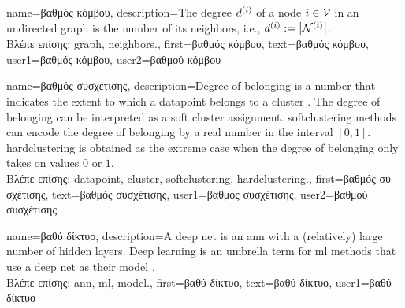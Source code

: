 {name={\foreignlanguage{greek}{βαθμός κόμβου}},
	description={The degree $d^{(i)}$ of a node $i \in \mathcal{V}$ 
		in an undirected \gls{graph} is the number of its \gls{neighbors}, i.e., $d^{(i)} := \big|\mathcal{N}^{(i)}\big|$.\\
		\foreignlanguage{greek}{Βλέπε επίσης:} \gls{graph}, \gls{neighbors}.},
		first={\foreignlanguage{greek}{βαθμός κόμβου}},
		text={\foreignlanguage{greek}{βαθμός κόμβου}},
		user1={\foreignlanguage{greek}{βαθμός κόμβου}}, %
  		user2={\foreignlanguage{greek}{βαθμού κόμβου}} %
}

{name={\foreignlanguage{greek}{βαθμός συσχέτισης}},
	description={Degree of belonging is a number that indicates the extent to which a \gls{datapoint} 
		belongs to a \gls{cluster} \cite[Ch. 8]{MLBasics}. The degree of belonging can be 
		interpreted as a soft \gls{cluster} assignment. \Gls{softclustering} methods can 
		encode the degree of belonging by a real number in the interval $[0,1]$. 
		\Gls{hardclustering} is obtained as the extreme case when the degree of belonging 
		only takes on values $0$ or $1$.\\
		\foreignlanguage{greek}{Βλέπε επίσης:} \gls{datapoint}, \gls{cluster}, \gls{softclustering}, \gls{hardclustering}.}, 
		first={\foreignlanguage{greek}{βαθμός συσχέτισης}},
		text={\foreignlanguage{greek}{βαθμός συσχέτισης}},
		user1={\foreignlanguage{greek}{βαθμός συσχέτισης}}, %
    		user2={\foreignlanguage{greek}{βαθμού συσχέτισης}} %
}

{name={\foreignlanguage{greek}{βαθύ δίκτυο}},
	description={A deep net is an \gls{ann} with a (relatively) large number of 
	hidden layers. Deep learning is an umbrella term for \gls{ml} methods that use a deep 
	net as their \gls{model} \cite{Goodfellow-et-al-2016}.\\
	\foreignlanguage{greek}{Βλέπε επίσης:} \gls{ann}, \gls{ml}, \gls{model}.},
	first={\foreignlanguage{greek}{βαθύ δίκτυο}},
	text={\foreignlanguage{greek}{βαθύ δίκτυο}},
	user1={\foreignlanguage{greek}{βαθύ δίκτυο}} %
}

